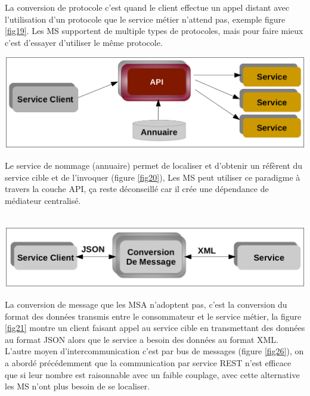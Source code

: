 \documentclass[12pt, a4paper, openany]{report}
\begin{document}
    La conversion de protocole c'est quand le client effectue un  appel distant avec l'utilisation d'un protocole que le service métier n'attend pas, exemple figure \ref{fig19}. Les MS supportent de multiple types de protocoles,  mais pour faire mieux c'est d'essayer d'utiliser le même protocole. \\
    
    \begin{center}
      \includegraphics[scale=0.3]{annuaire_20.png}
      \label{fig20}
    \end{center}
    
    Le service de nommage (annuaire) permet de localiser et d'obtenir un réfèrent du service cible et de l'invoquer (figure \ref{fig20}), Les MS peut utiliser ce paradigme à travers la couche API, ça reste déconseillé car il crée une dépendance de médiateur centralisé.  \\ \\
    
    \begin{center}
      \includegraphics[scale=0.3]{convers_msg_21.png}
      \label{fig21}
    \end{center}   
    
    La conversion de message que les MSA n'adoptent pas, c'est la conversion du format des données transmis entre le consommateur et le service métier, la figure \ref{fig21} montre un client faisant appel au service cible en transmettant des données au format JSON alors que le service a besoin des données au format XML.\\
    
   
   L'autre moyen d'intercommunication c'est par bus de messages (figure \ref{fig26}), on a abordé précédemment  que la communication par service REST n'est efficace que si leur nombre est raisonnable avec un faible couplage, avec cette alternative les MS n'ont plus besoin de se localiser.
   
\end{document}
